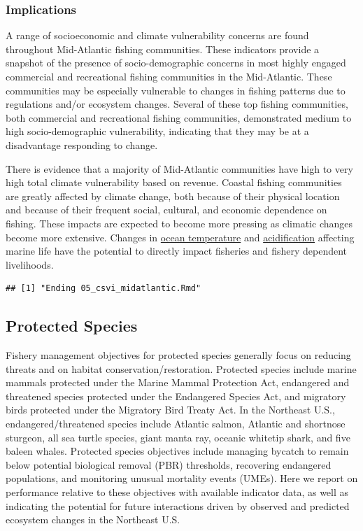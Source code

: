 \documentclass[
  10pt,
]{article}
\begin{document}
\subsubsection{Implications}\label{implications-4}

A range of socioeconomic and climate vulnerability concerns are found throughout Mid-Atlantic fishing communities. These indicators provide a snapshot of the presence of socio-demographic concerns in most highly engaged commercial and recreational fishing communities in the Mid-Atlantic. These communities may be especially vulnerable to changes in fishing patterns due to regulations and/or ecosystem changes. Several of these top fishing communities, both commercial and recreational fishing communities, demonstrated medium to high socio-demographic vulnerability, indicating that they may be at a disadvantage responding to change.

There is evidence that a majority of Mid-Atlantic communities have high to very high total climate vulnerability based on revenue. Coastal fishing communities are greatly affected by climate change, both because of their physical location and because of their frequent social, cultural, and economic dependence on fishing. These impacts are expected to become more pressing as climatic changes become more extensive. Changes in \href{https://noaa-edab.github.io/catalog/bottom_temp_insitu.html}{ocean temperature} and \href{https://noaa-edab.github.io/catalog/ocean_acidification.html}{acidification} affecting marine life have the potential to directly impact fisheries and fishery dependent livelihoods.

\begin{verbatim}
## [1] "Ending 05_csvi_midatlantic.Rmd"
\end{verbatim}

\subsection{Protected Species}\label{protected-species}

Fishery management objectives for protected species generally focus on reducing threats and on habitat conservation/restoration. Protected species include marine mammals protected under the Marine Mammal Protection Act, endangered and threatened species protected under the Endangered Species Act, and migratory birds protected under the Migratory Bird Treaty Act. In the Northeast U.S., endangered/threatened species include Atlantic salmon, Atlantic and shortnose sturgeon, all sea turtle species, giant manta ray, oceanic whitetip shark, and five baleen whales. Protected species objectives include managing bycatch to remain below potential biological removal (PBR) thresholds, recovering endangered populations, and monitoring unusual mortality events (UMEs). Here we report on performance relative to these objectives with available indicator data, as well as indicating the potential for future interactions driven by observed and predicted ecosystem changes in the Northeast U.S.
\end{document}
